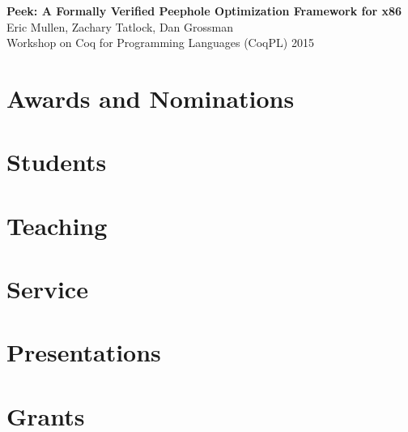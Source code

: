 \documentclass[10pt]{article}
\begin{document}
\textbf{%
Peek: A Formally Verified Peephole Optimization Framework for x86
} \\
Eric Mullen, Zachary Tatlock, Dan Grossman \\
Workshop on Coq for Programming Languages (CoqPL) 2015 \\




\section*{Awards and Nominations}

\section*{Students}

\section*{Teaching}

\section*{Service}

\section*{Presentations}

\section*{Grants}
\end{document}
